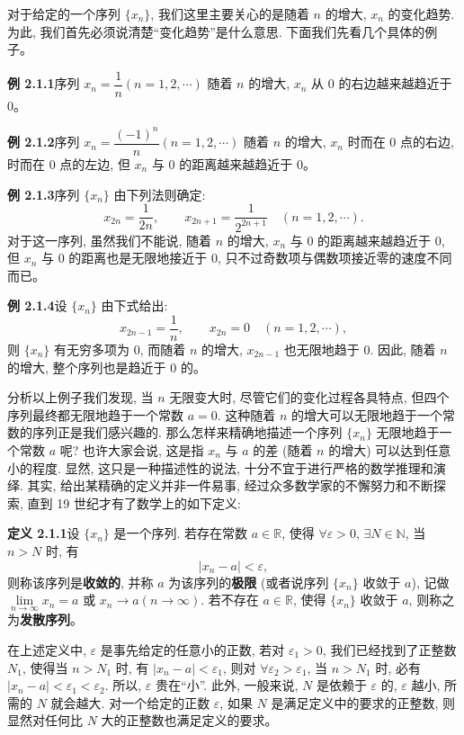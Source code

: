 \documentclass[UTF8, 12pt, fontset=fandol, oneside]{ctexart}
\begin{document}
对于给定的一个序列 $\{x_n\}$, 我们这里主要关心的是随着 $n$ 的增大, $x_n$ 的变化趋势. 为此, 我们首先必须说清楚``变化趋势''是什么意思. 下面我们先看几个具体的例子。

\noindent\textbf{例 2.1.1}\quad 序列 $x_n=\dfrac1n(n=1,2,\cdots)$ 随着 $n$ 的增大, $x_n$ 从 $0$ 的右边越来越趋近于 $0$。

\noindent\textbf{例 2.1.2}\quad 序列 $x_n=\dfrac{(-1)^n}{n}(n=1,2,\cdots)$ 随着 $n$ 的增大, $x_n$ 时而在 $0$ 点的右边, 时而在 $0$ 点的左边, 但 $x_n$ 与 $0$ 的距离越来越趋近于 $0$。

\noindent\textbf{例 2.1.3}\quad 序列 $\{x_n\}$ 由下列法则确定:
\[
  x_{2n}=\frac1{2n},\qquad
  x_{2n+1}=\frac1{2^{2n+1}}
  \quad(n=1,2,\cdots).
\]
对于这一序列, 虽然我们不能说, 随着 $n$ 的增大, $x_n$ 与 $0$ 的距离越来越趋近于 $0$, 但 $x_n$ 与 $0$ 的距离也是无限地接近于 $0$, 只不过奇数项与偶数项接近零的速度不同而已。

\noindent\textbf{例 2.1.4}\quad 设 $\{x_n\}$ 由下式给出:
\[
  x_{2n-1}=\frac1n,\qquad
  x_{2n}=0
  \quad(n=1,2,\cdots),
\]
则 $\{x_n\}$ 有无穷多项为 $0$, 而随着 $n$ 的增大, $x_{2n-1}$ 也无限地趋于 $0$. 因此, 随着 $n$ 的增大, 整个序列也是趋近于 $0$ 的。

分析以上例子我们发现, 当 $n$ 无限变大时, 尽管它们的变化过程各具特点, 但四个序列最终都无限地趋于一个常数 $a=0$. 这种随着 $n$ 的增大可以无限地趋于一个常数的序列正是我们感兴趣的. 那么怎样来精确地描述一个序列 $\{x_n\}$ 无限地趋于一个常数 $a$ 呢? 也许大家会说, 这是指 $x_n$ 与 $a$ 的差 (随着 $n$ 的增大) 可以达到任意小的程度. 显然, 这只是一种描述性的说法, 十分不宜于进行严格的数学推理和演绎. 其实, 给出某精确的定义并非一件易事, 经过众多数学家的不懈努力和不断探索, 直到 19 世纪才有了数学上的如下定义:

\noindent\textbf{定义 2.1.1}\quad 设 $\{x_n\}$ 是一个序列. 若存在常数 $a\in\mathbb{R}$, 使得 $\forall\varepsilon>0$, $\exists N\in\mathbb{N}$, 当 $n>N$ 时, 有
\[
  |x_n-a|<\varepsilon,
\]
则称该序列是\textbf{收敛的}, 并称 $a$ 为该序列的\textbf{极限} (或者说序列 $\{x_n\}$ 收敛于 $a$), 记做 $\lim\limits_{n\to\infty}x_n=a$ 或 $x_n\to a(n\to\infty)$. 若不存在 $a\in\mathbb{R}$, 使得 $\{x_n\}$ 收敛于 $a$, 则称之为\textbf{发散序列}。

在上述定义中, $\varepsilon$ 是事先给定的任意小的正数, 若对 $\varepsilon_1>0$, 我们已经找到了正整数 $N_1$, 使得当 $n>N_1$ 时, 有 $|x_n-a|<\varepsilon_1$, 则对 $\forall\varepsilon_2>\varepsilon_1$, 当 $n>N_1$ 时, 必有 $|x_n-a|<\varepsilon_1<\varepsilon_2$. 所以, $\varepsilon$ 贵在``小''. 此外, 一般来说, $N$ 是依赖于 $\varepsilon$ 的, $\varepsilon$ 越小, 所需的 $N$ 就会越大. 对一个给定的正数 $\varepsilon$, 如果 $N$ 是满足定义中的要求的正整数, 则显然对任何比 $N$ 大的正整数也满足定义的要求。
\end{document}
